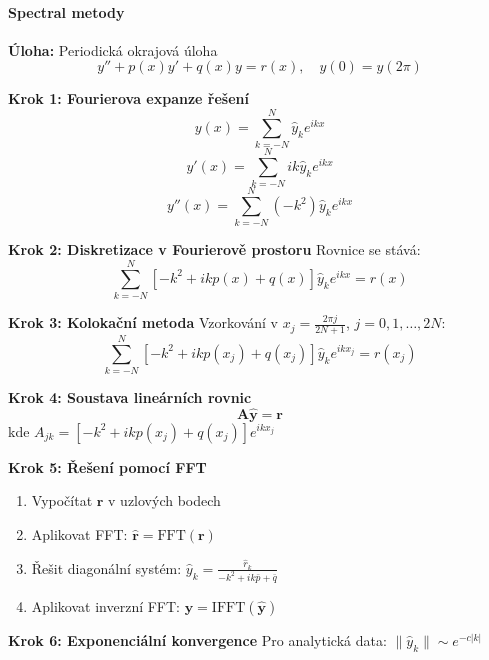 \paragraph{Spectral metody}

\begin{example}
\label{ex:spectral-metoda}

\noindent\textbf{Úloha:} Periodická okrajová úloha
\[
y'' + p(x)y' + q(x)y = r(x), \quad y(0) = y(2\pi)
\]

\vspace{1.5\baselineskip}

\noindent\textbf{Krok 1: Fourierova expanze řešení}
\[
y(x) = \sum_{k=-N}^{N} \hat{y}_k e^{ikx}
\]
\[
y'(x) = \sum_{k=-N}^{N} ik\hat{y}_k e^{ikx}
\]
\[
y''(x) = \sum_{k=-N}^{N} (-k^2)\hat{y}_k e^{ikx}
\]

\vspace{1\baselineskip}

\noindent\textbf{Krok 2: Diskretizace v Fourierově prostoru}
Rovnice se stává:
\[
\sum_{k=-N}^{N} \left[-k^2 + ikp(x) + q(x)\right]\hat{y}_k e^{ikx} = r(x)
\]

\vspace{1\baselineskip}

\noindent\textbf{Krok 3: Kolokační metoda}
Vzorkování v $x_j = \frac{2\pi j}{2N+1}$, $j = 0, 1, \dots, 2N$:
\[
\sum_{k=-N}^{N} \left[-k^2 + ikp(x_j) + q(x_j)\right]\hat{y}_k e^{ikx_j} = r(x_j)
\]

\vspace{1\baselineskip}

\noindent\textbf{Krok 4: Soustava lineárních rovnic}
\[
\mathbf{A}\mathbf{\hat{y}} = \mathbf{r}
\]
kde $A_{jk} = [-k^2 + ikp(x_j) + q(x_j)]e^{ikx_j}$

\vspace{1\baselineskip}

\noindent\textbf{Krok 5: Řešení pomocí FFT}
\begin{enumerate}
\item Vypočítat $\mathbf{r}$ v uzlových bodech
\item Aplikovat FFT: $\mathbf{\hat{r}} = \text{FFT}(\mathbf{r})$
\item Řešit diagonální systém: $\hat{y}_k = \frac{\hat{r}_k}{-k^2 + ik\bar{p} + \bar{q}}$
\item Aplikovat inverzní FFT: $\mathbf{y} = \text{IFFT}(\mathbf{\hat{y}})$
\end{enumerate}

\vspace{1\baselineskip}

\noindent\textbf{Krok 6: Exponenciální konvergence}
Pro analytická data: $\|\hat{y}_k\| \sim e^{-c|k|}$

\end{example}

